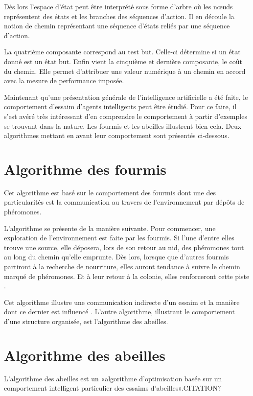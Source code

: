 Dès lors l'espace d'état peut être interprété sous forme d'arbre où les nœuds représentent des états et les branches des séquences d'action. Il en découle la notion de chemin représentant une séquence d'états reliés par une séquence d'action.

La quatrième composante correspond au test but. Celle-ci détermine si un état donné est un état but. Enfin vient la cinquième et dernière composante, le coût du chemin. Elle permet d'attribuer une valeur numérique à un chemin en accord avec la mesure de performance imposée.

Maintenant qu'une présentation générale de l'intelligence artificielle a été faite, le comportement d'essaim d'agents intelligents peut être étudié. Pour ce faire, il s'est avéré très intéressant d'en comprendre le comportement à partir d'exemples se trouvant dans la nature. Les fourmis et les abeilles illustrent bien cela. Deux algorithmes mettant en avant leur comportement sont présentés ci-dessous.

\section{Algorithme des fourmis}

Cet algorithme est basé sur le comportement des fourmis dont une des particularités est la communication au travers de l'environnement par dépôts de phéromones.

L'algorithme se présente de la manière suivante. Pour commencer, une exploration de l'environnement est faite par les fourmis. Si l'une d'entre elles trouve une source, elle déposera, lors de son retour au nid, des phéromones tout au long du chemin qu'elle emprunte. Dès lors, lorsque que d'autres fourmis partiront à la recherche de nourriture, elles auront tendance à suivre le chemin  marqué de phéromones. Et à leur retour à la colonie, elles renforceront cette piste \cite{wikiFourmi}.

Cet algorithme illustre une communication indirecte d'un essaim et la manière dont ce dernier est influencé \cite{communicationFourmis}. L'autre algorithme, illustrant le comportement d'une structure organisée, est l'algorithme des abeilles.

\section{Algorithme des abeilles}

L'algorithme des abeilles est un «algorithme d'optimisation basée sur un comportement intelligent particulier des essaims d'abeilles».CITATION?

